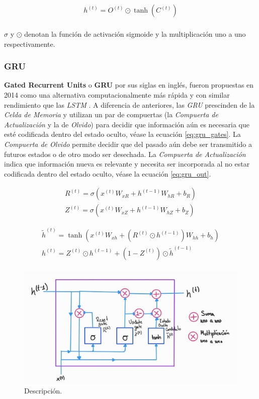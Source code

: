 \begin{equation}
    \begin{split}
        h^{(t)} =  O^{(t)} \odot \tanh(C^{(t)}) \\
    \end{split}
\end{equation}

\noindent $\sigma$ y $\odot$ denotan la función de activación sigmoide y la multiplicación uno a uno
respectivamente.


\subsubsection{GRU}

\textbf{Gated Recurrent Units} o \textbf{GRU} por sus siglas en inglés, fueron propuestas en 2014
\cite{GRU1} como una alternativa computacionalmente más rápida y con similar rendimiento que las
\textit{LSTM} \cite{GRU2}. A diferencia de anteriores, las \textit{GRU} prescinden de la
\textit{Celda de Memoria} y utilizan un par de compuertas (la \textit{Compuerta de Actualización} y
la de \textit{Olvido}) para decidir que información aún es necesaria que esté codificada dentro del
estado oculto, véase la ecuación \ref{eq:gru_gates}.
La \textit{Compuerta de Olvido} permite decidir que del pasado aún debe ser transmitido a futuros
estados o de otro modo ser desechada. La \textit{Compuerta de Actualización} indica que información nueva es relevante y
necesita ser incorporada al no estar codificada dentro del estado oculto,
véase la ecuación \ref{eq:gru_out}.

\begin{equation}
    \begin{split}
        R^{(t)} = \sigma(x^{(t)} W_{xR} + h^{(t-1)} W_{hR} + b_R)\\
        Z^{(t)} = \sigma(x^{(t)} W_{xZ} + h^{(t-1)} W_{hZ} + b_Z)
    \end{split}
    \label{eq:gru_gates}
\end{equation}

\begin{equation}
    \begin{split}
        \tilde h^{(t)} = \tanh(x^{(t)} W_{xh} + ( R^{(t)} \odot h^{(t-1)}) W_{hh} + b_h)\\
        h^{(t)} =  Z^{(t)} \odot h^{(t-1)} + (1 - Z^{(t)}) \odot \tilde h^{(t-1)} \\
    \end{split}
    \label{eq:gru_out}
\end{equation}

\begin{figure}[ht!]
\centering
\includegraphics[width=1.0 \textwidth]{Chapters/2. Transformer/Figures/rnn/GRU.jpg}
\caption{Descripción.}
\label{fig:rnn_gru}
\end{figure}

